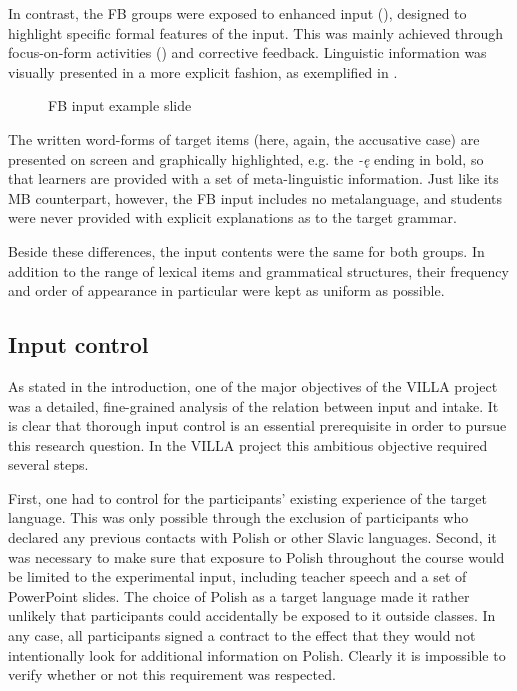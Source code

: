 In contrast, the FB groups were exposed to enhanced input (\citealt{Sharwood-Smith1993}), designed to highlight specific formal features of the input. This was mainly achieved through focus-on-form activities (\citealt{DoughtyWilliams1998}) and corrective feedback. Linguistic information was visually presented in a more explicit fashion, as exemplified in .

\begin{figure}[p]
    \caption{FB input example slide}
    \label{fig:02:2}
\end{figure}

The written word-forms of target items (here, again, the accusative case) are presented on screen and graphically highlighted, e.g. the \textit{-ę} ending in bold, so that learners are provided with a set of meta-linguistic information. Just like its MB counterpart, however, the FB input includes no metalanguage, and students were never provided with explicit explanations as to the target grammar. 

Beside these differences, the input contents were the same for both groups. In addition to the range of lexical items and grammatical structures, their frequency and order of appearance in particular were kept as uniform as possible. 

\subsection{Input control}\label{sec:02:1.1}

As stated in the introduction, one of the major objectives of the VILLA project was a detailed, fine-grained analysis of the relation between input and intake. It is clear that thorough input control is an essential prerequisite in order to pursue this research question. In the VILLA project this ambitious objective required several steps.

First, one had to control for the participants’ existing experience of the target language. This was  only possible through the exclusion of participants who declared any previous contacts with Polish or other Slavic languages. Second, it was necessary to make sure that exposure to Polish throughout the course would be limited to the experimental input, including teacher speech and a set of PowerPoint slides. The choice of Polish as a target language made it rather unlikely that participants could accidentally be exposed to it outside classes. In any case, all participants signed a contract to the effect that they would not intentionally look for additional information on Polish. Clearly it is impossible to verify whether or not this requirement was respected.


